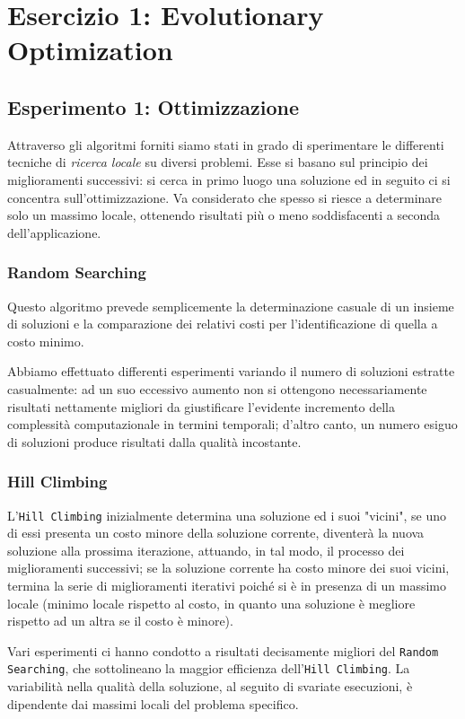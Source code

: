 \raggedright
{}
	\label{ch:opt}
	\section{Esercizio 1: Evolutionary Optimization}
		\label{sec:es1}
		\subsection{Esperimento 1: Ottimizzazione}
			Attraverso gli algoritmi forniti siamo stati in grado di sperimentare le differenti tecniche di \emph{ricerca locale} su diversi problemi. Esse si basano sul principio dei miglioramenti successivi: si cerca in primo luogo una soluzione ed in seguito ci si concentra sull'ottimizzazione. Va considerato che spesso si riesce a determinare solo un massimo locale, ottenendo risultati più o meno soddisfacenti a seconda dell'applicazione.
			\subsubsection{Random Searching}
				Questo algoritmo prevede semplicemente la determinazione casuale di un insieme di soluzioni e la comparazione dei relativi costi per l'identificazione di quella a costo minimo.\par
				Abbiamo effettuato differenti esperimenti variando il numero di soluzioni estratte casualmente: ad un suo eccessivo aumento non si ottengono necessariamente risultati nettamente migliori da giustificare l'evidente incremento della complessità computazionale in termini temporali; d'altro canto, un numero esiguo di soluzioni produce risultati dalla qualità incostante.
			\subsubsection{Hill Climbing}
				L'\texttt{Hill Climbing} inizialmente determina una soluzione ed i suoi "vicini", se uno di essi presenta un costo minore della soluzione corrente, diventerà la nuova soluzione alla prossima iterazione, attuando, in tal modo, il processo dei miglioramenti successivi; se la soluzione corrente ha costo minore dei suoi vicini, termina la serie di miglioramenti iterativi poiché si è in presenza di un massimo locale (minimo locale rispetto al costo, in quanto una soluzione è megliore rispetto ad un altra se il costo è minore).\par
				Vari esperimenti ci hanno condotto a risultati decisamente migliori del \texttt{Random Searching}, che sottolineano la maggior efficienza dell'\texttt{Hill Climbing}. La variabilità nella qualità della soluzione, al seguito di svariate esecuzioni, è dipendente dai massimi locali del problema specifico.
